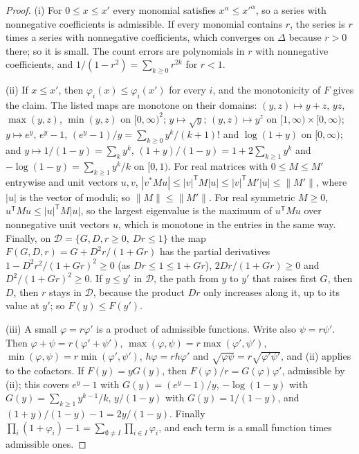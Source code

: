 \begin{proof}
(i) For $0\le x\le x'$ every monomial satisfies $x^\alpha\le x'^\alpha$, so a
series with nonnegative coefficients is admissible. If every monomial contains
$r$, the series is $r$ times a series with nonnegative coefficients, which
converges on $\Delta$ because $r>0$ there; so it is small. The count errors are
polynomials in $r$ with nonnegative coefficients, and
$1/(1-r^2)=\sum_{k\ge0}r^{2k}$ for $r<1$.

(ii) If $x\le x'$, then $\varphi_i(x)\le\varphi_i(x')$ for every $i$, and the
monotonicity of $F$ gives the claim. The listed maps are monotone on their
domains: $(y,z)\mapsto y+z$, $yz$, $\max(y,z)$, $\min(y,z)$ on $[0,\infty)^2$;
$y\mapsto\sqrt y$; $(y,z)\mapsto y^z$ on $[1,\infty)\times[0,\infty)$;
$y\mapsto e^y$, $e^y-1$, $(e^y-1)/y=\sum_{k\ge0}y^k/(k+1)!$ and $\log(1+y)$ on
$[0,\infty)$; and $y\mapsto1/(1-y)=\sum_ky^k$,
$(1+y)/(1-y)=1+2\sum_{k\ge1}y^k$ and $-\log(1-y)=\sum_{k\ge1}y^k/k$ on $[0,1)$.
For real matrices with $0\le M\le M'$ entrywise and unit vectors $u,v$,
$|v^*Mu|\le|v|^{\mathsf T}M|u|\le|v|^{\mathsf T}M'|u|\le\|M'\|$, where $|u|$ is
the vector of moduli; so $\|M\|\le\|M'\|$. For real symmetric $M\ge0$,
$u^{\mathsf T}Mu\le|u|^{\mathsf T}M|u|$, so the largest eigenvalue is the maximum
of $u^{\mathsf T}Mu$ over nonnegative unit vectors $u$, which is monotone in the
entries in the same way. Finally, on
$\mathcal D=\{G,D,r\ge0,\ Dr\le1\}$ the map $F(G,D,r)=G+D^2r/(1+Gr)$ has the
partial derivatives $1-D^2r^2/(1+Gr)^2\ge0$ (as $Dr\le1\le1+Gr$),
$2Dr/(1+Gr)\ge0$ and $D^2/(1+Gr)^2\ge0$. If $y\le y'$ in $\mathcal D$, the
path from $y$ to $y'$ that raises first $G$, then $D$, then $r$ stays in
$\mathcal D$, because the product $Dr$ only increases along it, up to its
value at $y'$; so $F(y)\le F(y')$.

(iii) A small $\varphi=r\varphi'$ is a product of admissible functions. Write
also $\psi=r\psi'$. Then $\varphi+\psi=r(\varphi'+\psi')$,
$\max(\varphi,\psi)=r\max(\varphi',\psi')$,
$\min(\varphi,\psi)=r\min(\varphi',\psi')$, $h\varphi=rh\varphi'$ and
$\sqrt{\varphi\psi}=r\sqrt{\varphi'\psi'}$, and (ii) applies to the cofactors.
If $F(y)=yG(y)$, then $F(\varphi)/r=G(\varphi)\varphi'$, admissible by (ii);
this covers $e^y-1$ with $G(y)=(e^y-1)/y$, $-\log(1-y)$ with
$G(y)=\sum_{k\ge1}y^{k-1}/k$, $y/(1-y)$ with $G(y)=1/(1-y)$, and
$(1+y)/(1-y)-1=2y/(1-y)$. Finally
$\prod_i(1+\varphi_i)-1=\sum_{\emptyset\ne I}\prod_{i\in I}\varphi_i$, and each
term is a small function times admissible ones.


\end{proof}
